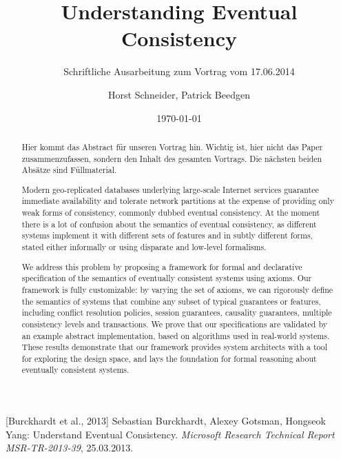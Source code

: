 \documentclass{scrartcl}
\title{Understanding Eventual Consistency}
\subtitle{Schriftliche Ausarbeitung zum Vortrag vom 17.06.2014}
\author{Horst Schneider, Patrick Beedgen}
\date{\today}
\begin{document}
 
\maketitle

\begin{abstract}

Hier kommt das Abstract für unseren Vortrag hin. Wichtig ist, hier nicht das Paper zusammenzufassen, sondern den Inhalt des gesamten Vortrags. Die nächsten beiden Absätze sind Füllmaterial.

Modern geo-replicated databases underlying large-scale Internet services guarantee immediate availability and tolerate network partitions at the expense of providing only weak forms of consistency, commonly dubbed eventual consistency. At the moment there is a lot of confusion about the semantics of eventual consistency, as different systems implement it with different sets of features and in subtly different forms, stated either informally or using disparate and low-level formalisms.

We address this problem by proposing a framework for formal and declarative specification of the semantics of eventually consistent systems using axioms. Our framework is fully customizable: by varying the set of axioms, we can rigorously define the semantics of systems that combine any subset of typical guarantees or features, including conflict resolution policies, session guarantees, causality guarantees, multiple consistency levels and transactions. We prove that our specifications are validated by an example abstract implementation, based on algorithms used in real-world systems. These results demonstrate that our framework provides system architects with a tool for exploring the design space, and lays the foundation for formal reasoning about eventually consistent systems.
\end{abstract}

\pagebreak
  
\begin{thebibliography}{10}

[Burckhardt et al., 2013]
Sebastian Burckhardt, Alexey Gotsman, Hongseok Yang:
\newblock Understand Eventual Consistency.
\newblock \emph{Microsoft Research Technical Report MSR-TR-2013-39}, 25.03.2013.

\end{thebibliography}
\end{document}
